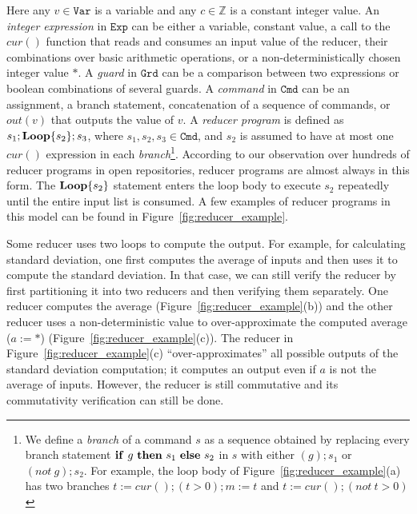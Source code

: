 \documentclass{llncs}
\newcommand{\Var}{\mathtt{Var}}
\newcommand{\Exp}{\mathtt{Exp}}
\newcommand{\Cmd}{\mathtt{Cmd}}
\newcommand{\Grd}{\mathtt{Grd}}
\newcommand{\cur}{cur()}
\newcommand{\ite}[3]{
	 \ifmmode
	 \mathbf{if}\ #1 \ \mathbf{then}\ #2\  \mathbf{else}\ #3
	 \else
	 \textbf{if}\ #1 \ \textbf{then}\ #2\  \textbf{else}\ #3
	 \fi}
\newcommand{\rloop}{
	\ifmmode
	\mathbf{Loop}
	\else
	\textbf{Loop}
	\fi}
\newcommand{\Z}{\mathbb{Z}}
\begin{document}
Here any $v\in \Var$ is a variable and any $c \in \Z$ is a constant integer value. An \emph{integer expression} in $\Exp$ can be either a variable, constant value, a call to the $\cur$ function that reads and consumes an input value of the reducer, their combinations over basic arithmetic operations, or a non-deterministically chosen integer value $*$.
A \emph{guard} in $\Grd$ can be a comparison between two expressions or boolean combinations of several guards. A \emph{command} in $\Cmd$ can be an assignment, a branch statement, concatenation of a sequence of commands, or $out(v)$ that outputs the value of $v$.
A \emph{reducer program} is defined as $s_1;\rloop\{s_2\};s_3$, where $s_1,s_2,s_3 \in \Cmd$, and $s_2$ is assumed to have at most one $\cur$ expression in each \emph{branch}\footnote{We define a \emph{branch} of a command $s$ as a sequence obtained by replacing every branch statement $\ite{g}{s_1}{s_2}$ in $s$ with either $(g); s_1$ or $(not\ g) ;s_2$. For example, the loop body of Figure~\ref{fig:reducer_example}(a) has two branches $t:=\cur; (t>0); m:=t$ and $t:=\cur;(not\ t>0)$ }. According to our observation over hundreds  of reducer programs in open repositories, reducer programs are almost always in this form. The $\rloop\{s_2\}$ statement enters the loop body to execute $s_2$ repeatedly until the entire input list is consumed. A few examples of reducer programs in this model can be found in Figure~\ref{fig:reducer_example}.


Some reducer uses two loops to compute the output. For example, for calculating standard deviation, one first computes the average of inputs and then uses it to compute the standard deviation. In that case, we can still verify the reducer by first partitioning it into two reducers and then verifying them separately. One reducer computes the average (Figure~\ref{fig:reducer_example}(b)) and the other reducer uses a non-deterministic value to over-approximate the computed average ($a := *$) (Figure~\ref{fig:reducer_example}(c)). The reducer in Figure~\ref{fig:reducer_example}(c) ``over-approximates''  all possible outputs of the standard deviation computation; it computes an output even if $a$ is not the average of inputs. However, the reducer is still commutative and its commutativity verification can still be done.
\end{document}
